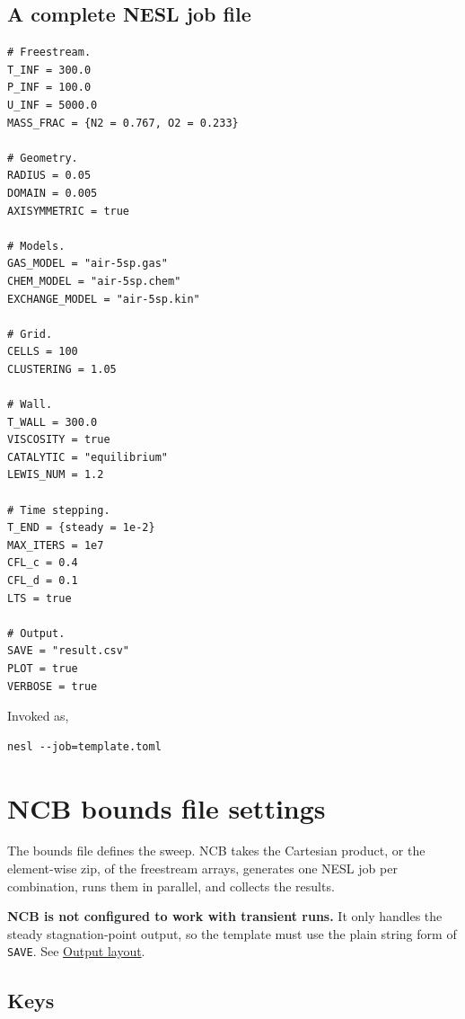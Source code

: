 \documentclass[10pt,a4paper]{article}
\renewcommand{\_}{\origunderscore\penalty4000\relax}
\begin{document}
\subsection*{A complete NESL job file}

\begin{lstlisting}
# Freestream.
T_INF = 300.0
P_INF = 100.0
U_INF = 5000.0
MASS_FRAC = {N2 = 0.767, O2 = 0.233}

# Geometry.
RADIUS = 0.05
DOMAIN = 0.005
AXISYMMETRIC = true

# Models.
GAS_MODEL = "air-5sp.gas"
CHEM_MODEL = "air-5sp.chem"
EXCHANGE_MODEL = "air-5sp.kin"

# Grid.
CELLS = 100
CLUSTERING = 1.05

# Wall.
T_WALL = 300.0
VISCOSITY = true
CATALYTIC = "equilibrium"
LEWIS_NUM = 1.2

# Time stepping.
T_END = {steady = 1e-2}
MAX_ITERS = 1e7
CFL_c = 0.4
CFL_d = 0.1
LTS = true

# Output.
SAVE = "result.csv"
PLOT = true
VERBOSE = true
\end{lstlisting}

Invoked as,
\begin{lstlisting}[style=plain]
nesl --job=template.toml
\end{lstlisting}

\section*{NCB bounds file settings}
\label{sec:ncb}

The bounds file defines the sweep. NCB takes the Cartesian product, or the element-wise zip, of the freestream arrays, generates one NESL job per combination, runs them in parallel, and collects the results.

\textbf{NCB is not configured to work with transient runs.} It only handles the steady stagnation-point output, so the template must use the plain string form of \texttt{SAVE}. See \hyperref[sec:ncb-output]{Output layout}.

\subsection*{Keys}
\end{document}
